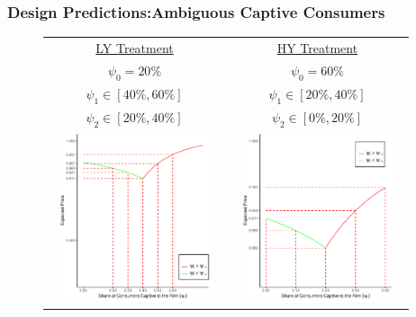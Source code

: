 \documentclass[red]{beamer}
\begin{document}
\begin{frame} [t]
\frametitle{Design Predictions:Ambiguous Captive Consumers}
\begin{figure} [h] 
\begin{center}
\begin{tabular}{c c}
\underline{LY Treatment} & \underline{HY Treatment} \\
$\psi_0 = 20\%$ & $\psi_0 = 60\%$ \\
$\psi_1 \in [40\%, 60\%]$ & $\psi_1 \in [20\%, 40\%]$ \\
$\psi_2 \in [20\%, 40\%]$ & $\psi_2 \in [0\%, 20\%]$ \\
\includegraphics[width=5cm,height=5cm]{A20 (1).pdf} & \includegraphics[width=5cm,height=5cm]{A60 (1).pdf}
\end{tabular}
\end{center}
\end{figure}
\end{frame}
\end{document}
